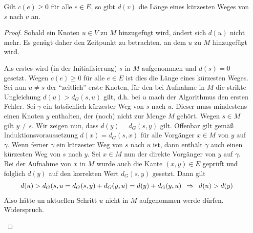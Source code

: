 \begin{aussage}
	Gilt $c(e) \ge 0$ für alle $e \in E$, so gibt $d(v)$ die Länge eines kürzesten Weges von $s$ nach $v$ an.
\end{aussage}
\begin{proof}
	Sobald ein Knoten $u \in V$ zu $M$ hinzugefügt wird, ändert sich $d(u)$ nicht mehr. Es genügt daher den Zeitpunkt zu betrachten, an dem $u$ zu $M$ hinzugefügt wird.
	\begin{induction}
		\ianfang Als erstes wird (in der Initialisierung) $s$ in $M$ aufgenommen und $d(s) = 0$ gesetzt. Wegen $c(e) \ge 0$ für alle $e \in E$ ist dies die Länge eines kürzesten Weges.
		\ischritt Sei nun $u \neq s$ der \enquote{zeitlich} erste Knoten, für den bei Aufnahme in $M$ die strikte Ungleichung $d(u) > d_G(s,u)$ gilt, d.h. bei $u$ mach der Algorithmus den ersten Fehler. Sei $\gamma$ ein tatsächlich kürzester Weg von $s$ nach $u$. Dieser muss mindestens einen Knoten $y$ enthalten, der (noch) nicht zur Menge $M$ gehört. Wegen $s \in M$ gilt $y \neq s$. Wir zeigen nun, dass $d(y) = d_G(s,y)$ gilt. Offenbar gilt gemäß Induktionsvoraussetzung $d(x) = d_G(s,x)$ für alle Vorgänger $x \in M$ von $y$ auf $\gamma$. Wenn ferner $\gamma$ ein kürzester Weg von $s$ nach $u$ ist, dann enthält $\gamma$ auch einen kürzesten Weg von $s$ nach $y$. Sei $x \in M$ nun der direkte Vorgänger von $y$ auf $\gamma$. Bei der Aufnahme von $x$ in $M$ wurde auch die Kante $(x,y) \in E$ geprüft und folglich $d(y)$ auf den korrekten Wert $d_G(s,y)$ gesetzt. Dann gilt
		\begin{equation*}
			d(u) > d_G(s,u = d_G(s,y) + d_G(y,u) = d(y) + d_G(y,u) \enskip \Rightarrow \enskip d(u) > d(y)
		\end{equation*}
		Also hätte un aktuellen Schritt $u$ nicht in $M$ aufgenommen werde dürfen. Widerspruch.
	\end{induction}
\end{proof}

